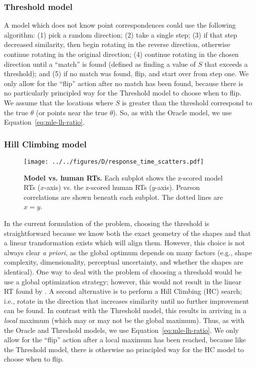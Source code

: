 \documentclass[10pt,letterpaper]{article}
\newcommand{\Oc}[0]{Oracle}
\newcommand{\Th}[0]{Threshold}
\newcommand{\Hc}[0]{HC}
\begin{document}
\subsubsection{Threshold model}

A model which does not know point correspondences could use the
following algorithm: (1) pick a random direction; (2) take a single
step; (3) if that step decreased similarity, then begin rotating in
the reverse direction, otherwise continue rotating in the original
direction; (4) continue rotating in the chosen direction until a
``match'' is found (defined as finding a value of $S$ that exceeds a
threshold); and (5) if no match was found, flip, and start over from
step one.  We only allow for the ``flip'' action after no match has
been found, because there is no particularly principled way for the
\Th{} model to choose when to flip. We assume that the locations where
$S$ is greater than the threshold correspond to the true $\theta$ (or
points near the true $\theta$). So, as with the \Oc{} model, we use
Equation~\ref{eq:mle-lh-ratio}.

\subsubsection{Hill Climbing model}

\begin{figure*}[t]
  \begin{center}
    \texttt{[image: ../../figures/D/response\_time\_scatters.pdf]}
    \caption{\textbf{Model vs. human RTs.} Each subplot shows the
      z-scored model RTs ($x$-axis) vs. the z-scored human RTs
      ($y$-axis). Pearson correlations are shown beneath each
      subplot. The dotted lines are $x=y$.}
    \label{fig:human-model-scatters}
  \end{center}
\end{figure*}

In the current formulation of the problem, choosing the threshold is
straightforward because we know both the exact geometry of the shapes
and that a linear transformation exists which will align
them. However, this choice is not always clear \textit{a priori}, as
the global optimum depends on many factors (e.g., shape complexity,
dimensionality, perceptual uncertainty, and whether the shapes are
identical).  One way to deal with the problem of choosing a threshold
would be use a global optimization strategy; however, this would not
result in the linear RT found by . A second
alternative is to perform a Hill Climbing (\Hc{}) search; i.e., rotate
in the direction that increases similarity until no further
improvement can be found. In contrast with the \Th{} model, this
results in arriving in a \textit{local} maximum (which may or may not
be the global maximum). Thus, as with the \Oc{} and \Th{} models, we
use Equation~\ref{eq:mle-lh-ratio}. We only allow for the ``flip''
action after a local maximum has been reached, because like the \Th{}
model, there is otherwise no principled way for the \Hc{} model to
choose when to flip.
\end{document}
